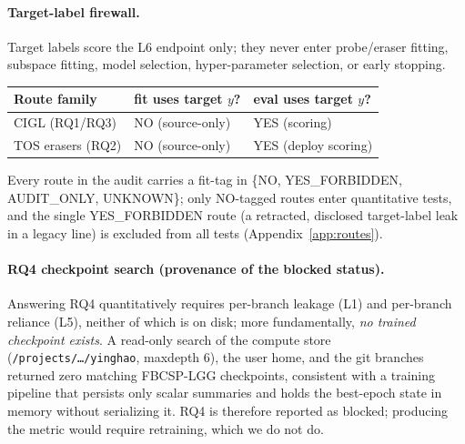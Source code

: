 \paragraph{Target-label firewall.} Target labels score the L6 endpoint only; they never enter
probe/eraser fitting, subspace fitting, model selection, hyper-parameter selection, or early stopping.
\begin{center}\small
\begin{tabular}{lll}
\toprule
Route family & fit uses target $y$? & eval uses target $y$? \\
\midrule
CIGL (RQ1/RQ3) & NO (source-only) & YES (scoring) \\
TOS erasers (RQ2) & NO (source-only) & YES (deploy scoring) \\
\bottomrule
\end{tabular}
\end{center}
Every route in the audit carries a fit-tag in \{NO, YES\_FORBIDDEN, AUDIT\_ONLY, UNKNOWN\}; only
NO-tagged routes enter quantitative tests, and the single YES\_FORBIDDEN route (a retracted, disclosed
target-label leak in a legacy line) is excluded from all tests (Appendix~\ref{app:routes}).

\paragraph{RQ4 checkpoint search (provenance of the blocked status).} Answering RQ4 quantitatively
requires per-branch leakage (L1) and per-branch reliance (L5), neither of which is on disk; more
fundamentally, \emph{no trained checkpoint exists}. A read-only search of the compute store
(\texttt{/projects/\dots/yinghao}, maxdepth 6), the user home, and the git branches returned zero
matching FBCSP-LGG checkpoints, consistent with a training pipeline that persists only scalar summaries
and holds the best-epoch state in memory without serializing it. RQ4 is therefore reported as blocked;
producing the metric would require retraining, which we do not do.
